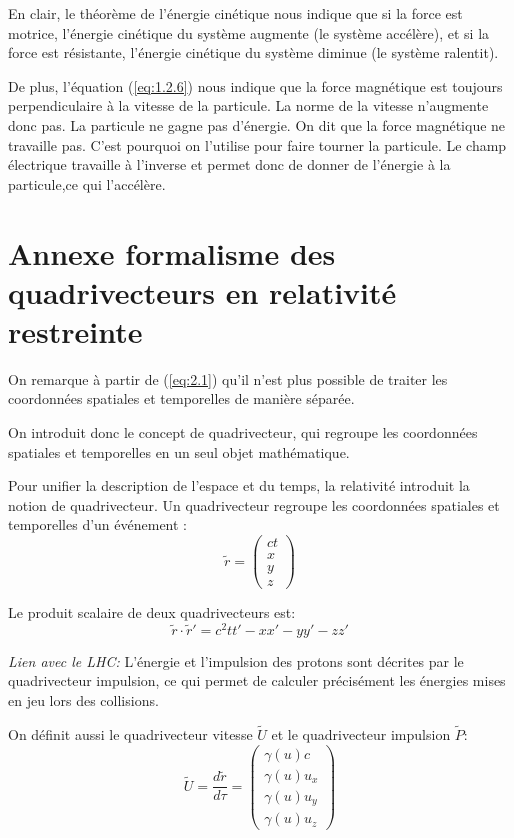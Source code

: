 \documentclass[14pt]{article}
\begin{document}
En clair, le théorème de l'énergie cinétique nous indique que si la force est motrice, l'énergie cinétique du système augmente (le système accélère), et si la force est résistante, l'énergie cinétique du système diminue (le système ralentit).

De plus, l'équation (\ref{eq:1.2.6}) nous indique que la force magnétique est toujours perpendiculaire à la vitesse de la particule. La norme de la vitesse n'augmente donc pas. La particule ne gagne pas d'énergie. On dit que la force magnétique ne travaille pas. C'est pourquoi on l'utilise pour faire tourner la particule. Le champ électrique travaille à l'inverse et permet donc de donner de l'énergie à la particule,ce qui l'accélère.


\section{Annexe formalisme des quadrivecteurs en relativité restreinte}


On remarque à partir de (\ref{eq:2.1}) qu'il n'est plus possible de traiter les coordonnées spatiales et temporelles de manière séparée.

On introduit donc le concept de quadrivecteur, qui regroupe les coordonnées spatiales et temporelles en un seul objet mathématique.

Pour unifier la description de l'espace et du temps, la relativité introduit la notion de quadrivecteur. Un quadrivecteur regroupe les coordonnées spatiales et temporelles d'un événement :
\begin{equation}\label{eq:4.1}
    \tilde{r} = \begin{pmatrix}
        ct \\
        x \\
        y \\
        z
    \end{pmatrix}
    \tag{4.1}
\end{equation}

Le produit scalaire de deux quadrivecteurs est:
\begin{equation}\label{eq:4.1.1}
    \tilde{r} \cdot \tilde{r}' = c^2 t t' - x x' - y y' - z z'
    \tag{4.1.1}
\end{equation}

\textit{Lien avec le LHC:} L'énergie et l'impulsion des protons sont décrites par le quadrivecteur impulsion, ce qui permet de calculer précisément les énergies mises en jeu lors des collisions.

On définit aussi le quadrivecteur vitesse $\tilde{U}$ et le quadrivecteur impulsion $\tilde{P}$:
\begin{equation} \label{eq:4.2}
    \tilde{U} = \frac{d\tilde{r}}{d\tau} = \begin{pmatrix}
        \gamma(u) c \\
        \gamma(u) u_x \\
        \gamma(u) u_y \\
        \gamma(u) u_z
    \end{pmatrix}
    \tag{4.2}
\end{equation}
\end{document}
